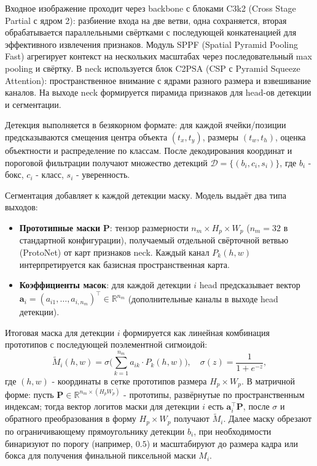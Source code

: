 \documentclass[areasetadvanced]{scrartcl}
\begin{document}
Входное изображение проходит через backbone с блоками C3k2 (Cross Stage Partial с ядром 2): разбиение входа на две ветви, одна сохраняется, вторая обрабатывается параллельными свёртками с последующей конкатенацией для эффективного извлечения признаков. Модуль SPPF (Spatial Pyramid Pooling Fast) агрегирует контекст на нескольких масштабах через последовательный max pooling и свёртку. В neck используется блок C2PSA (CSP с Pyramid Squeeze Attention): пространственное внимание с ядрами разного размера и взвешивание каналов. На выходе neck формируется пирамида признаков для head-ов детекции и сегментации.

Детекция выполняется в безякорном формате: для каждой ячейки/позиции предсказываются смещения центра объекта $(t_x, t_y)$, размеры $(t_w, t_h)$, оценка объектности и распределение по классам. После декодирования координат и пороговой фильтрации получают множество детекций $\mathcal{D} = \{(b_i, c_i, s_i)\}$, где $b_i$ - бокс, $c_i$ - класс, $s_i$ - уверенность.

Сегментация добавляет к каждой детекции маску. Модель выдаёт два типа выходов:
\begin{itemize}
    \item \textbf{Прототипные маски} $\mathbf{P}$: тензор размерности $n_m \times H_p \times W_p$ ($n_m = 32$ в стандартной конфигурации), получаемый отдельной свёрточной ветвью (ProtoNet) от карт признаков neck. Каждый канал $P_k(h,w)$ интерпретируется как базисная пространственная карта.
    \item \textbf{Коэффициенты масок}: для каждой детекции $i$ head предсказывает вектор $\mathbf{a}_i = (a_{i1}, \ldots, a_{i,n_m})^\top \in \mathbb{R}^{n_m}$ (дополнительные каналы в выходе head детекции).
\end{itemize}

Итоговая маска для детекции $i$ формируется как линейная комбинация прототипов с последующей поэлементной сигмоидой:
\begin{equation}
\tilde{M}_i(h,w) = \sigma\biggl( \sum_{k=1}^{n_m} a_{ik} \cdot P_k(h,w) \biggr),
\quad \sigma(z) = \frac{1}{1 + e^{-z}},
\end{equation}
где $(h,w)$ - координаты в сетке прототипов размера $H_p \times W_p$. В матричной форме: пусть $\mathbf{P} \in \mathbb{R}^{n_m \times (H_p W_p)}$ - прототипы, развёрнутые по пространственным индексам; тогда вектор логитов маски для детекции $i$ есть $\mathbf{a}_i^\top \mathbf{P}$, после $\sigma$ и обратного преобразования в форму $H_p \times W_p$ получают $\tilde{M}_i$. Далее маску обрезают по ограничивающему прямоугольнику детекции $b_i$, при необходимости бинаризуют по порогу (например, $0.5$) и масштабируют до размера кадра или бокса для получения финальной пиксельной маски $M_i$.
\end{document}
